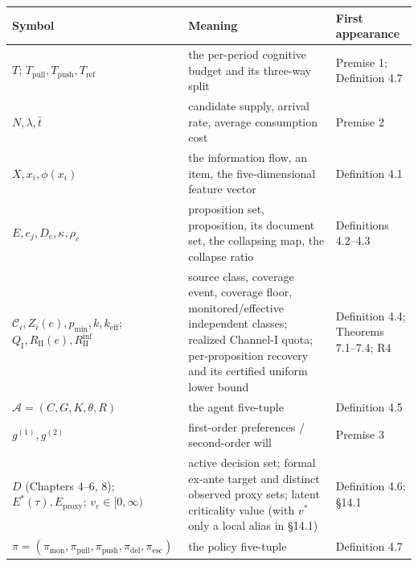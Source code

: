 \documentclass[
  11pt]{article}
\begin{document}
\begin{longtable}[]{@{}
  >{\raggedright\arraybackslash}p{}
  >{\raggedright\arraybackslash}p{}
  >{\raggedright\arraybackslash}p{}@{}}
\toprule\noalign{}
\begin{minipage}[b]{\linewidth}\raggedright
Symbol
\end{minipage} & \begin{minipage}[b]{\linewidth}\raggedright
Meaning
\end{minipage} & \begin{minipage}[b]{\linewidth}\raggedright
First appearance
\end{minipage} \\
\midrule\noalign{}
\endhead
\bottomrule\noalign{}
\endlastfoot
\(T\); \(T_{\mathrm{pull}}, T_{\mathrm{push}}, T_{\mathrm{ref}}\) & the
per-period cognitive budget and its three-way split & Premise 1;
Definition 4.7 \\
\(N, \lambda, \bar t\) & candidate supply, arrival rate, average
consumption cost & Premise 2 \\
\(X, x_i, \phi(x_i)\) & the information flow, an item, the
five-dimensional feature vector & Definition 4.1 \\
\(E, e_j, D_e, \kappa, \rho_c\) & proposition set, proposition, its
document set, the collapsing map, the collapse ratio & Definitions
4.2--4.3 \\
\(\mathcal{C}_i,Z_i(e),p_{\min},k,k_{\mathrm{eff}}\);
\(Q_{\mathrm I},R_{\mathrm{II}}(e),R_{\mathrm{II}}^{\inf}\) & source
class, coverage event, coverage floor, monitored/effective independent
classes; realized Channel-I quota; per-proposition recovery and its
certified uniform lower bound & Definition 4.4; Theorems 7.1--7.4; R4 \\
\(\mathcal{A}=(C,G,K,\theta,R)\) & the agent five-tuple & Definition
4.5 \\
\(g^{(1)}, g^{(2)}\) & first-order preferences / second-order will &
Premise 3 \\
\(D\) (Chapters 4--6, 8); \(E^*(\tau),E_{\mathrm{proxy}}\);
\(v_e\in[0,\infty)\) & active decision set; formal ex-ante target and
distinct observed proxy sets; latent criticality value (with \(v^*\)
only a local alias in §14.1) & Definition 4.6; §14.1 \\
\(\pi=(\pi_{\mathrm{mon}},\pi_{\mathrm{pull}},\pi_{\mathrm{push}},\pi_{\mathrm{del}},\pi_{\mathrm{esc}})\)
& the policy five-tuple & Definition 4.7 \\

\end{longtable}
\end{document}
